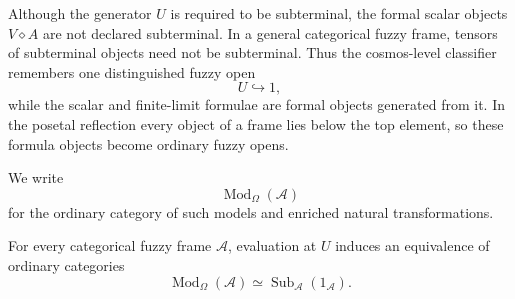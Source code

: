 \begin{remark}
\label{rem:scalar-formulae-not-necessarily-subterminal}
Although the generator \(U\) is required to be subterminal, the formal scalar objects
\(V\diamond A\) are not declared subterminal. In a general categorical fuzzy frame,
tensors of subterminal objects need not be subterminal. Thus the cosmos-level
classifier remembers one distinguished fuzzy open
\[
    U\hookrightarrow 1,
\]
while the scalar and finite-limit formulae are formal objects generated from it. In
the posetal reflection every object of a frame lies below the top element, so these
formula objects become ordinary fuzzy opens.
\end{remark}

We write
\[
    \operatorname{Mod}_{\Omega}(\mathcal A)
\]
for the ordinary category of such models and enriched natural transformations.

\begin{proposition}
\label{prop:models-sierpinski-sketch-subterminal}
For every categorical fuzzy frame \(\mathcal A\), evaluation at \(U\) induces an
equivalence of ordinary categories
\[
    \operatorname{Mod}_{\Omega}(\mathcal A)
    \simeq
    \operatorname{Sub}_{\mathcal A}(1_{\mathcal A}).
\]
\end{proposition}

